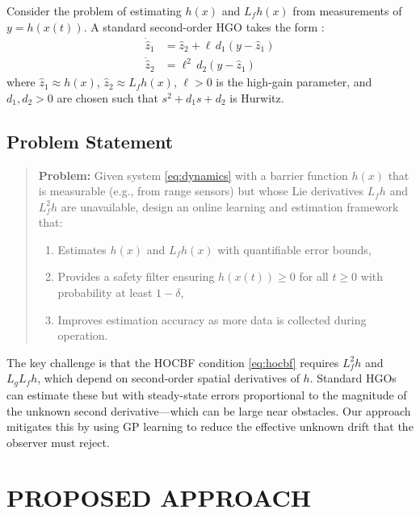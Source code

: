 \documentclass[letterpaper, 10 pt, conference]{ieeeconf}
\begin{document}
Consider the problem of estimating $h(x)$ and $L_f h(x)$ from measurements of $y = h(x(t))$. A standard second-order HGO takes the form \cite{khalil2017hgo}:
\begin{align}
    \dot{\hat{z}}_1 &= \hat{z}_2 + \ell \, d_1 (y - \hat{z}_1) \label{eq:hgo1}\\
    \dot{\hat{z}}_2 &= \ell^2 \, d_2 (y - \hat{z}_1) \label{eq:hgo2}
\end{align}
where $\hat{z}_1 \approx h(x)$, $\hat{z}_2 \approx L_f h(x)$, $\ell > 0$ is the high-gain parameter, and $d_1, d_2 > 0$ are chosen such that $s^2 + d_1 s + d_2$ is Hurwitz.

\subsection{Problem Statement}

\begin{quote}
\textbf{Problem:} Given system \eqref{eq:dynamics} with a barrier function $h(x)$ that is measurable (e.g., from range sensors) but whose Lie derivatives $L_f h$ and $L_f^2 h$ are unavailable, design an online learning and estimation framework that:
\begin{enumerate}
    \item Estimates $h(x)$ and $L_f h(x)$ with quantifiable error bounds,
    \item Provides a safety filter ensuring $h(x(t)) \geq 0$ for all $t \geq 0$ with probability at least $1 - \delta$,
    \item Improves estimation accuracy as more data is collected during operation.
\end{enumerate}
\end{quote}

The key challenge is that the HOCBF condition \eqref{eq:hocbf} requires $L_f^2 h$ and $L_g L_f h$, which depend on second-order spatial derivatives of $h$. Standard HGOs can estimate these but with steady-state errors proportional to the magnitude of the unknown second derivative---which can be large near obstacles. Our approach mitigates this by using GP learning to reduce the effective unknown drift that the observer must reject.

\section{PROPOSED APPROACH}
\label{sec:approach}
\end{document}
